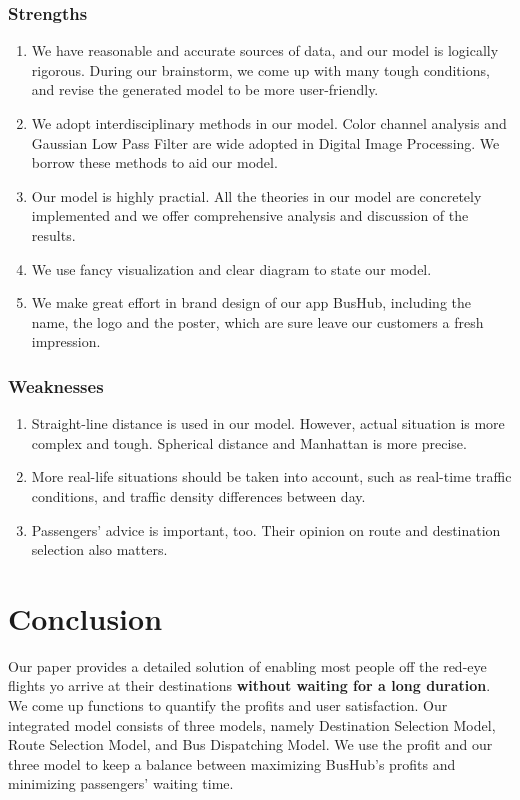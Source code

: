 \documentclass{mcmthesis}
\begin{document}
\subsubsection{Strengths}
\begin{enumerate}
    \item We have reasonable and accurate sources of data, and our model is logically rigorous. During our brainstorm, we come up with many tough conditions, and revise the generated model to be more user-friendly.
    \item We adopt interdisciplinary methods in our model. Color channel analysis and Gaussian Low Pass Filter are wide adopted in Digital Image Processing. We borrow these methods to aid our model.
    \item Our model is highly practial. All the theories in our model are concretely implemented and we offer comprehensive analysis and discussion of the results.
    \item We use fancy visualization and clear diagram to state our model.
    \item We make great effort in brand design of our app BusHub, including the name, the logo and the poster, which are sure leave our customers a fresh impression.
\end{enumerate}


\subsubsection{Weaknesses}
\begin{enumerate}
    \item Straight-line distance is used in our model. However, actual situation is more complex and tough. Spherical distance and Manhattan is more precise. 
    \item More real-life situations should be taken into account, such as real-time traffic conditions, and traffic density differences between day.
    \item Passengers' advice is important, too. Their opinion on route and destination selection also matters.
\end{enumerate}

\section{Conclusion}\label{sec:conc}

Our paper provides a detailed solution of enabling most people off the red-eye flights yo arrive at their destinations \textbf{without waiting for a long duration}. We come up functions to quantify the profits and user satisfaction. Our integrated model consists of three models, namely Destination Selection Model, Route Selection Model, and Bus Dispatching Model. We use the profit and our three model to keep a balance between maximizing BusHub's profits and minimizing passengers' waiting time.
\end{document}
